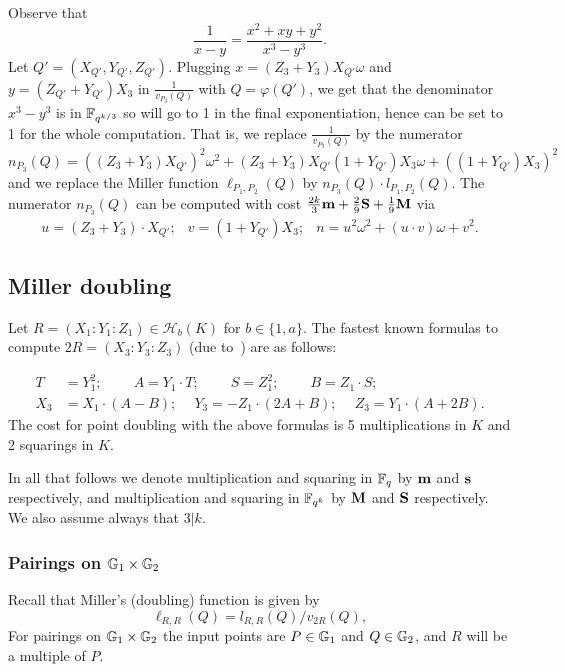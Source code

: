 Observe that
\[\frac{1}{x-y} = \frac{x^2 + xy + y^2}{x^3-y^3}.\]
Let $Q' = (X_{Q'},Y_{Q'},Z_{Q'})$.
Plugging $x = (Z_3 + Y_3)X_{Q'}\omega$ and $y = (Z_{Q'}+Y_{Q'})X_3$ in $\frac{1}{v_{P_3}(Q)}$ with $Q = \varphi(Q')$,
we get that the denominator $x^3 - y^3$ is in $\mathbb{F}_{q^{k/3}}$ so will go to 1 in the final exponentiation, hence can be set to 1 for the whole computation.
That is, we replace $\frac{1}{v_{P_3}(Q)}$ by the numerator 
$$n_{P_3}(Q) = ((Z_3 + Y_3)X_{Q'})^2\omega^2 
+ (Z_3 + Y_3)X_{Q'}(1+Y_{Q'})X_3\omega 
+ ((1+Y_{Q'})X_3)^2$$
and we replace the Miller function 
$\ell_{P_1,P_2}(Q)$ by $n_{P_3}(Q) \cdot l_{P_1,P_2}(Q)$.
The numerator $n_{P_3}(Q)$ can be computed with cost
$\frac{2k}{3}\textbf{m} + \frac{2}{9}\textbf{S} + \frac{1}{9}\textbf{M}$ via
\[\begin{array}{cccc}
u = (Z_3 + Y_3)\cdot X_{Q'}; &
v = (1+Y_{Q'})X_3; &
n = u^2\omega^2 + (u\cdot v)\omega + v^2.
\end{array}\]

\subsection{Miller doubling}

Let $R = (X_1 : Y_1 : Z_1) \in \mathcal{H}_b(K)$ for $b \in \{1,a\}$.
The fastest known formulas to compute $2R = (X_3 : Y_3 : Z_3)$
(due to~\cite{2010/hess}) are as follows:

\begin{align*}
T &= Y_1^2;\	\qquad	A = Y_1 \cdot T;\	\qquad
S = Z_1 ^ 2;\	\qquad	B = Z_1 \cdot S;\\
X_3 &= X_1 \cdot (A - B);\	\quad
Y_3 = -Z_1 \cdot (2A + B);\	\quad
Z_3 = Y_1 \cdot (A + 2B).
\end{align*}
The cost for point doubling with the above formulas is 5 multiplications in $K$ and 2 squarings in $K$.

In all that follows we denote multiplication and squaring in $\mathbb{F}_{q}$ by $\textbf{m}$ and $\textbf{s}$ respectively, and multiplication and squaring in $\mathbb{F}_{q^k}$ by $\textbf{M}$ and $\textbf{S}$ respectively. We also assume always that $3|k$.

\subsubsection{Pairings on $\mathbb{G}_{1} \times \mathbb{G}_{2}$}

Recall that Miller's (doubling) function is given by
$$\ell_{R,R}(Q) = l_{R,R}(Q)/v_{2R}(Q),$$
For pairings on $\mathbb{G}_{1} \times \mathbb{G}_{2}$ the input points are
$P \in \mathbb{G}_{1}$ and $Q \in \mathbb{G}_{2}$, and
$R$ will be a multiple of $P$.

